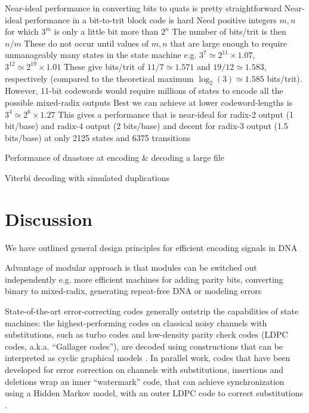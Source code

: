\documentclass[english]{article}
\begin{document}
Near-ideal performance in converting bits to quats is pretty straightforward
Near-ideal performance in a bit-to-trit block code is hard
Need positive integers $m,n$ for which $3^m$ is only a little bit more than $2^n$
The number of bits/trit is then $n/m$
These do not occur until values of $m,n$ that are large enough to require unmanageably many states in the state machine
e.g. $3^7 \simeq 2^{11} \times 1.07$, $3^{12} \simeq 2^{19} \times 1.01$
These give bits/trit of $11/7 \simeq 1.571$ and $19/12 \simeq 1.583$, respectively
(compared to the theoretical maximum $\log_2(3) \simeq 1.585$ bits/trit).
However, 11-bit codewords would require millions of states to encode all the possible mixed-radix outputs
Best we can achieve at lower codeword-lengths is $3^4 \simeq 2^6 \times 1.27$
This gives a performance that is near-ideal for radix-2 output (1 bit/base) and radix-4 output (2 bits/base)
and decent for radix-3 output (1.5 bits/base)
at only 2125 states and 6375 transitions

%


Performance of dnastore at encoding \& decoding a large file

Viterbi decoding with simulated duplications


\section{Discussion}

We have outlined general design principles for efficient encoding signals in DNA

Advantage of modular approach is that modules can be switched out independently
e.g. more efficient machines for
adding parity bits, converting binary to mixed-radix, generating repeat-free DNA
or modeling errors

State-of-the-art error-correcting codes generally outstrip the capabilities of state machines:
the highest-performing codes on classical noisy channels with substitutions, such as turbo codes and low-density parity check codes (LDPC codes, a.k.a. ``Gallager codes''),
are decoded using constructions that can be interpreted as cyclic graphical models \cite{Mackay1997,FreyMackay98}.
In parallel work, codes that have been developed for error correction on channels with substitutions, insertions and deletions
wrap an inner ``watermark'' code, that can achieve synchronization using a Hidden Markov model, with an outer LDPC code to correct substitutions
\cite{DaveyMackay2000,DaveyMackay2001}.
\end{document}
